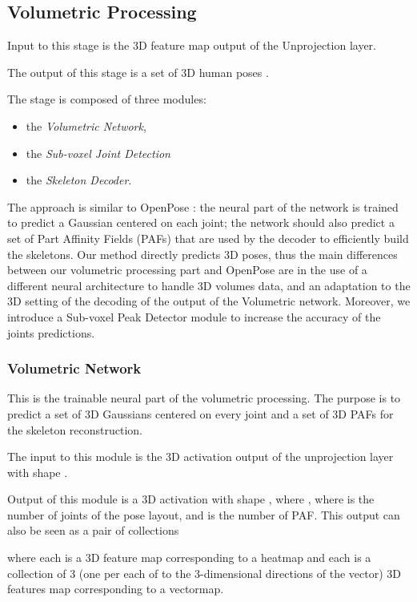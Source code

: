 \documentclass[a4paper,conference]{IEEEtran}
\begin{document}
\subsection{Volumetric Processing}

Input to this stage is the 3D feature map  output of the Unprojection layer.

The output of this stage is a set of 3D human poses 
.

The stage is composed of three modules: 
\begin{itemize}
    \item the \emph{Volumetric Network},
    \item the \emph{Sub-voxel Joint Detection}
    \item the \emph{Skeleton Decoder}.
\end{itemize}
The approach is similar to
OpenPose \cite{cao2017realtime}: the neural part of the network is 
trained to predict a Gaussian centered on each joint; the network 
should also predict a set of Part Affinity Fields (PAFs) that are 
used by the decoder to efficiently build the skeletons. 
Our method directly predicts 3D poses, thus the main differences 
between our volumetric processing part and OpenPose are in the use 
of a different neural 
architecture to handle 3D volumes data, and 
an adaptation to the 3D setting of the decoding of the output
of the Volumetric network.
Moreover, we introduce a Sub-voxel Peak Detector module
to increase the accuracy of the joints predictions.

\subsubsection{Volumetric Network}\label{sec:volumetric_network}

This is the trainable neural part of the volumetric processing. 
The purpose is to predict a set of 3D Gaussians centered on every joint 
and a set of 3D PAFs for the skeleton reconstruction.

The input to this module is the 3D activation  output of
the unprojection layer with shape 
.

Output of this module is a 3D activation  with shape
, where 
, where 
 is the number of joints of the pose layout, and 
 is the number of PAF.
This output can also be seen as a pair of collections

where each  is a 3D feature map corresponding to a heatmap
and each  is a collection of 3 (one per each of to the
3-dimensional directions of the vector)
3D features map corresponding 
to a vectormap.
\end{document}
